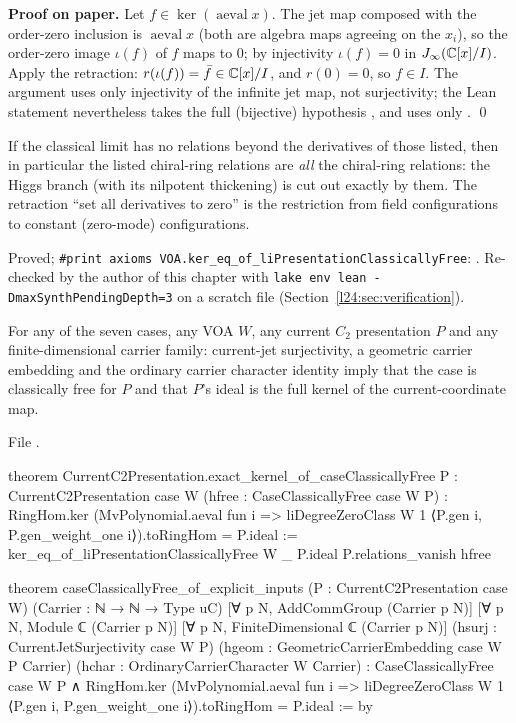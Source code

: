 \textbf{Proof on paper.} Let $f\in\ker(\operatorname{aeval}x)$. The jet map composed with the order-zero
inclusion is $\operatorname{aeval}x$ (both are algebra maps agreeing on the $x_i$), so the order-zero image
$\iota(f)$ of $f$ maps to $0$; by injectivity $\iota(f)=0$ in $J_\infty({\mathbb{C}}[x]/I)$. Apply the retraction:
$r(\iota(f))=\bar f\in{\mathbb{C}}[x]/I$, and $r(0)=0$, so $f\in I$. The argument uses only injectivity of the infinite jet map,
not surjectivity; the Lean statement nevertheless takes the full (bijective) hypothesis
, and uses only . \qed

\begin{physics}
If the classical limit has no relations beyond the derivatives of those listed, then in particular the
listed chiral-ring relations are \emph{all} the chiral-ring relations: the Higgs branch (with its nilpotent
thickening) is cut out exactly by them. The retraction ``set all derivatives to zero'' is the restriction
from field configurations to constant (zero-mode) configurations.
\end{physics}

\begin{status}
Proved; \texttt{\#print axioms VOA.ker\_eq\_of\_liPresentationClassicallyFree}:
. Re-checked by the author of this chapter with
\texttt{lake env lean -DmaxSynthPendingDepth=3} on a scratch file (Section~\ref{l24:sec:verification}).
\end{status}

\begin{theorem}\label{l24:thm:capstone}
For any of the seven cases, any VOA $W$, any current $C_2$ presentation $P$ and any finite-dimensional carrier
family: current-jet surjectivity, a geometric carrier embedding and the ordinary carrier character identity
imply that the case is classically free for $P$ and that $P$'s ideal is the full kernel of the
current-coordinate map.
\end{theorem}
\noindent File .
\begin{leancode}
theorem CurrentC2Presentation.exact_kernel_of_caseClassicallyFree
    {P : CurrentC2Presentation case W} (hfree : CaseClassicallyFree case W P) :
    RingHom.ker
        (MvPolynomial.aeval fun i =>
          liDegreeZeroClass W 1 ⟨P.gen i, P.gen_weight_one i⟩).toRingHom =
      P.ideal :=
  ker_eq_of_liPresentationClassicallyFree W _ P.ideal P.relations_vanish hfree

theorem caseClassicallyFree_of_explicit_inputs
    (P : CurrentC2Presentation case W)
    (Carrier : ℕ → ℕ → Type uC)
    [∀ p N, AddCommGroup (Carrier p N)]
    [∀ p N, Module ℂ (Carrier p N)]
    [∀ p N, FiniteDimensional ℂ (Carrier p N)]
    (hsurj : CurrentJetSurjectivity case W P)
    (hgeom : GeometricCarrierEmbedding case W P Carrier)
    (hchar : OrdinaryCarrierCharacter W Carrier) :
    CaseClassicallyFree case W P ∧
      RingHom.ker
          (MvPolynomial.aeval fun i =>
            liDegreeZeroClass W 1 ⟨P.gen i, P.gen_weight_one i⟩).toRingHom =
        P.ideal := by
\end{leancode}

